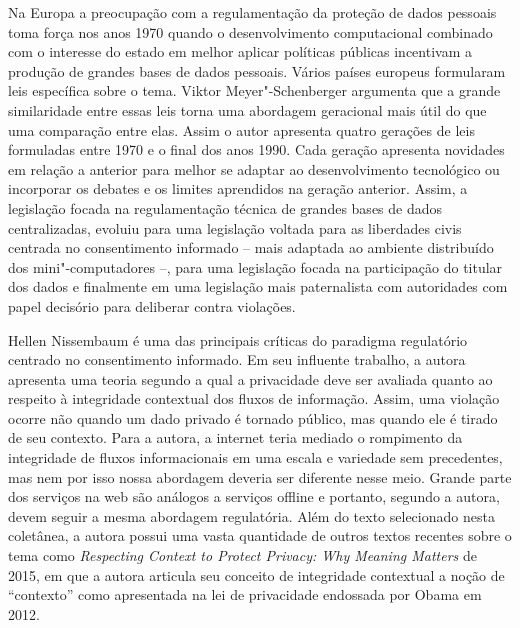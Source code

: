Na Europa a preocupação com a regulamentação da proteção de dados
pessoais toma força nos anos 1970 quando o desenvolvimento computacional
combinado com o interesse do estado em melhor aplicar políticas públicas
incentivam a produção de grandes bases de dados pessoais. Vários países
europeus formularam leis específica sobre o tema. Viktor
Meyer"-Schenberger argumenta que a grande similaridade entre essas leis
torna uma abordagem geracional mais útil do que uma comparação entre
elas. Assim o autor apresenta quatro gerações de leis formuladas entre
1970 e o final dos anos 1990. Cada geração apresenta novidades em
relação a anterior para melhor se adaptar ao desenvolvimento tecnológico
ou incorporar os debates e os limites aprendidos na geração anterior.
Assim, a legislação focada na regulamentação técnica de grandes bases de
dados centralizadas, evoluiu para uma legislação voltada para as
liberdades civis centrada no consentimento informado -- mais adaptada ao
ambiente distribuído dos mini"-computadores --, para uma legislação focada
na participação do titular dos dados e finalmente em uma legislação mais
paternalista com autoridades com papel decisório para deliberar contra
violações.

Hellen Nissembaum é uma das principais críticas do paradigma regulatório
centrado no consentimento informado. Em seu influente trabalho, a autora
apresenta uma teoria segundo a qual a privacidade deve ser avaliada
quanto ao respeito à integridade contextual dos fluxos de informação.
Assim, uma violação ocorre não quando um dado privado é tornado público,
mas quando ele é tirado de seu contexto. Para a autora, a internet teria
mediado o rompimento da integridade de fluxos informacionais em uma
escala e variedade sem precedentes, mas nem por isso nossa abordagem
deveria ser diferente nesse meio. Grande parte dos serviços na web são
análogos a serviços offline e portanto, segundo a autora, devem seguir a
mesma abordagem regulatória. Além do texto selecionado nesta coletânea,
a autora possui uma vasta quantidade de outros textos recentes sobre o
tema como \emph{Respecting Context to Protect Privacy: Why Meaning
Matters} de 2015, em que a autora articula seu conceito de integridade
contextual a noção de ``contexto'' como apresentada na lei de
privacidade endossada por Obama em 2012.

